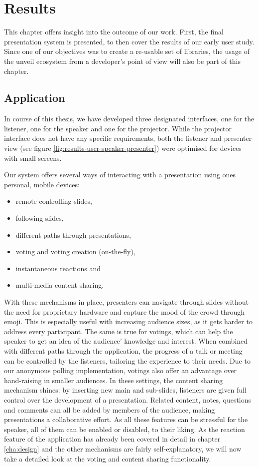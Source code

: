 \chapter{Results}
\label{cha:results}

This chapter offers insight into the outcome of our work. First, the final presentation system is presented, to then cover the results of our early user study. Since one of our objectives was to create a re-usable set of libraries, the usage of the unveil ecosystem from a developer's point of view will also be part of this chapter.

\section{Application}
\label{sec:results-user}
In course of this thesis, we have developed three designated interfaces, one for the listener, one for the speaker and one for the projector. While the projector interface does not have any specific requirements, both the listener and presenter view (see figure \ref{fig:results-user-speaker-presenter}) were optimised for devices with small screens.

Our system offers several ways of interacting with a presentation using ones personal, mobile devices:
\begin{itemize}
\item remote controlling slides,
\item following slides,
\item different paths through presentations,
\item voting and voting creation (on-the-fly),
\item instantaneous reactions and
\item multi-media content sharing.
\end{itemize}
%
With these mechanisms in place, presenters can navigate through slides without the need for proprietary hardware and capture the mood of the crowd through emoji. This is especially useful with increasing audience sizes, as it gets harder to address every participant. The same is true for votings, which can help the speaker to get an idea of the audience' knowledge and interest. When combined with different paths through the application, the progress of a talk or meeting can be controlled by the listeners, tailoring the experience to their needs. Due to our anonymous polling implementation, votings also offer an advantage over hand-raising in smaller audiences. In these settings, the content sharing mechanism shines: by inserting new main and sub-slides, listeners are given full control over the development of a presentation. Related content, notes, questions and comments can all be added by members of the audience, making presentations a collaborative effort. As all these features can be stressful for the speaker, all of them can be enabled or disabled, to their liking.
As the reaction feature of the application has already been covered in detail in chapter \ref{cha:design} and the other mechanisms are fairly self-explanatory, we will now take a detailed look at the voting and content sharing functionality.

